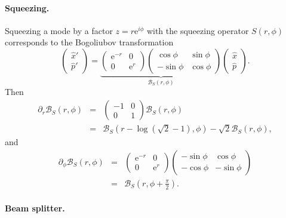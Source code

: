\documentclass[aps,pra,10pt,twocolumn,groupedaddress,nofootinbib]{revtex4-1}
\theoremstyle{plain}
\newcommand{\x}{\hat{x}}
\newcommand{\p}{\hat{p}}
\newcommand{\e}{\mathrm{e}}
\begin{document}
\paragraph{Squeezing.}
Squeezing a mode by a factor $z = r \e^{i\phi}$ with the squeezing operator $S(r, \phi)$ corresponds to the Bogoliubov transformation
\[ \begin{pmatrix} \x'\\ \p' \end{pmatrix} = \underbrace{\begin{pmatrix} \e^{-r} & 0 \\ 0 & \e^{r} \end{pmatrix} \begin{pmatrix} \cos \phi & \sin \phi \\ - \sin \phi & \cos \phi \end{pmatrix}}_{\mathcal{B}_S(r, \phi)} \begin{pmatrix} \x \\ \p \end{pmatrix}. \]
Then
\begin{eqnarray*} \partial_{r} \mathcal{B}_S(r, \phi) &=& \begin{pmatrix} -1 & 0 \\ 0 & 1 \end{pmatrix}
\mathcal{B}_S(r, \phi) \\
&=& \mathcal{B}_S(r-\log (\sqrt{2}-1), \phi) - \sqrt{2} \mathcal{B}_S(r, \phi),\end{eqnarray*}
and
\begin{eqnarray*} \partial_{\phi} \mathcal{B}_S(r, \phi) &=& \begin{pmatrix} \e^{-r} & 0 \\ 0 & \e^{r} \end{pmatrix} \begin{pmatrix} -\sin \phi & \cos \phi \\ - \cos \phi & -\sin \phi \end{pmatrix}\\
&=& \mathcal{B}_S(r, \phi + \frac{\pi}{2}).\end{eqnarray*}



\paragraph{Beam splitter.}
\end{document}
